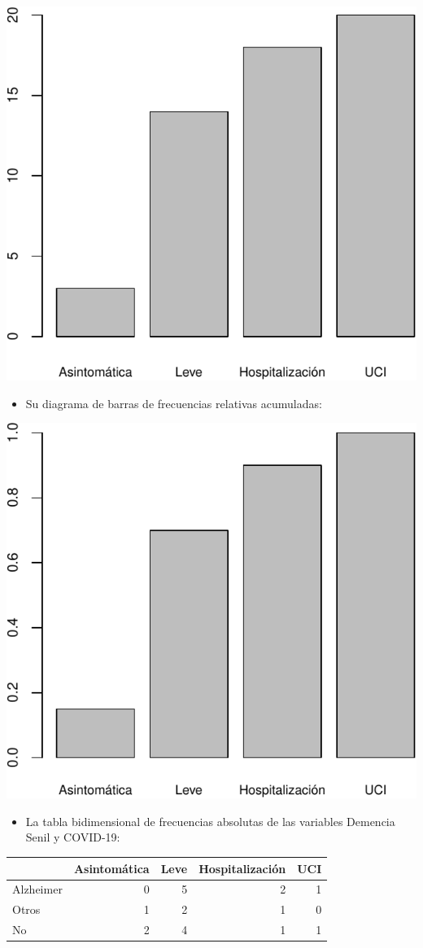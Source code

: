 \documentclass[
]{book}
\providecommand{\tightlist}{%
  \setlength{\itemsep}{0pt}\setlength{\parskip}{0pt}}
\theoremstyle{definition}
\theoremstyle{definition}
\theoremstyle{definition}
\theoremstyle{definition}
\theoremstyle{remark}
\begin{document}
\begin{center}\includegraphics[width=0.5\linewidth]{INREMDN_files/figure-latex/unnamed-chunk-241-1} \end{center}

\begin{itemize}
\tightlist
\item
  Su diagrama de barras de frecuencias relativas acumuladas:
\end{itemize}

\begin{center}\includegraphics[width=0.5\linewidth]{INREMDN_files/figure-latex/unnamed-chunk-242-1} \end{center}

\begin{itemize}
\tightlist
\item
  La tabla bidimensional de frecuencias absolutas de las variables Demencia Senil y COVID-19:
\end{itemize}

\begin{tabular}{l|r|r|r|r}
\hline
  & Asintomática & Leve & Hospitalización & UCI\\
\hline
Alzheimer & 0 & 5 & 2 & 1\\
\hline
Otros & 1 & 2 & 1 & 0\\
\hline
No & 2 & 4 & 1 & 1\\
\hline
\end{tabular}
\end{document}
